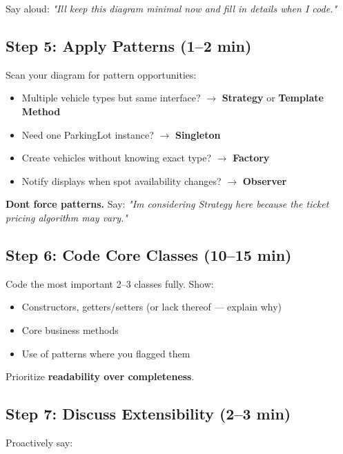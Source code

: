 \documentclass[11pt]{article}
\providecommand{\tightlist}{\setlength{\itemsep}{1pt}\setlength{\parskip}{0pt}}
\begin{document}
Say aloud: \emph{"I\textquotesingle ll keep this diagram minimal now and fill in details when I code."}

\subsection{Step 5: Apply Patterns (1--2 min)}\label{step-5-apply-patterns-12-min}

Scan your diagram for pattern opportunities:

\begin{itemize}
\tightlist
\item
  Multiple vehicle types but same interface? \(\rightarrow\) \textbf{Strategy} or \textbf{Template Method}
\item
  Need one ParkingLot instance? \(\rightarrow\) \textbf{Singleton}
\item
  Create vehicles without knowing exact type? \(\rightarrow\) \textbf{Factory}
\item
  Notify displays when spot availability changes? \(\rightarrow\) \textbf{Observer}
\end{itemize}

\textbf{Don\textquotesingle t force patterns.} Say: \emph{"I\textquotesingle m considering Strategy here because the ticket pricing algorithm may vary."}

\subsection{Step 6: Code Core Classes (10--15 min)}\label{step-6-code-core-classes-1015-min}

Code the most important 2--3 classes fully. Show:

\begin{itemize}
\tightlist
\item
  Constructors, getters/setters (or lack thereof --- explain why)
\item
  Core business methods
\item
  Use of patterns where you flagged them
\end{itemize}

Prioritize \textbf{readability over completeness}.

\subsection{Step 7: Discuss Extensibility (2--3 min)}\label{step-7-discuss-extensibility-23-min}

Proactively say:
\end{document}
